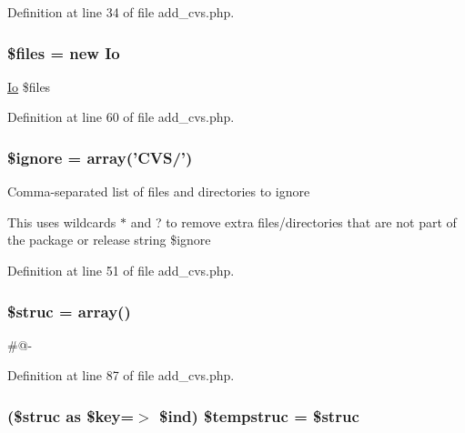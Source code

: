 \-Definition at line 34 of file add\-\_\-cvs.\-php.

\hypertarget{add__cvs_8php_a9590b15215a21e9b42eb546aeef79704}{
\subsubsection[{\$files}]{\setlength{\rightskip}{0pt plus 5cm}\$files = new {\bf \-Io}}}\label{add__cvs_8php_a9590b15215a21e9b42eb546aeef79704}
\hyperlink{class_io}{\-Io} \$files 

\-Definition at line 60 of file add\-\_\-cvs.\-php.

\hypertarget{add__cvs_8php_a442f628e2139e0335194a8e88fc3bd63}{
\subsubsection[{\$ignore}]{\setlength{\rightskip}{0pt plus 5cm}\$ignore = array('\-C\-V\-S/')}}\label{add__cvs_8php_a442f628e2139e0335194a8e88fc3bd63}
\-Comma-\/separated list of files and directories to ignore

\-This uses wildcards $\ast$ and ? to remove extra files/directories that are not part of the package or release  string \$ignore 

\-Definition at line 51 of file add\-\_\-cvs.\-php.

\hypertarget{add__cvs_8php_a886c96662e4f53a2f636dbcf2ec17535}{
\subsubsection[{\$struc}]{\setlength{\rightskip}{0pt plus 5cm}\$struc = array()}}\label{add__cvs_8php_a886c96662e4f53a2f636dbcf2ec17535}
\#@-\/ 

\-Definition at line 87 of file add\-\_\-cvs.\-php.

\hypertarget{add__cvs_8php_a76fab6eea690851b68845e9497c8d4b8}{
\subsubsection[{\$tempstruc}]{ (\$struc as \$key=$>$ \$ind) \$tempstruc = \$struc}}\label{add__cvs_8php_a76fab6eea690851b68845e9497c8d4b8}


